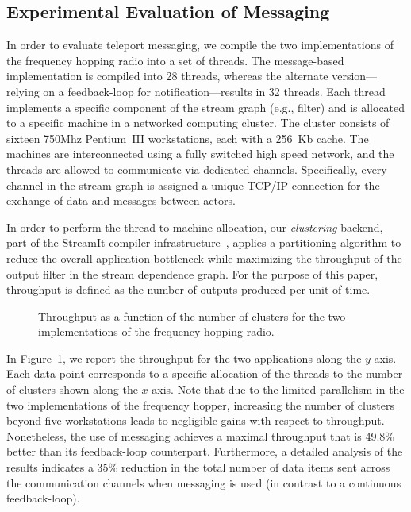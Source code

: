 

\subsection{Experimental Evaluation of Messaging}

In order to evaluate teleport messaging, we compile the two
implementations of the frequency hopping radio into a set of
threads. The message-based implementation is compiled into 28 threads,
whereas the alternate version---relying on a feedback-loop for
notification---results in 32 threads.  Each thread implements a
specific component of the stream graph (e.g., filter) and is allocated
to a specific machine in a networked computing cluster.  The cluster
consists of sixteen 750Mhz Pentium~III workstations, each with a
256~Kb cache.  The machines are interconnected using a fully switched
high speed network, and the threads are allowed to communicate via
dedicated channels. Specifically, every channel in the stream graph is
assigned a unique TCP/IP connection for the exchange of data and
messages between actors.

In order to perform the thread-to-machine allocation, our {\it
clustering} backend, part of the StreamIt compiler
infrastructure~\cite{streamit-asplos}, applies a partitioning
algorithm to reduce the overall application bottleneck while
maximizing the throughput of the output filter in the stream
dependence graph. For the purpose of this paper, throughput is defined
as the number of outputs produced per unit of time.

\begin{figure}[t]
\caption{\small Throughput as a function of the number of clusters for
the two implementations of the frequency hopping radio.
\protect\label{fig:fhr-throughput}}
\end{figure}

In Figure~\ref{fig:fhr-throughput}, we report the throughput for the
two applications along the $y$-axis.  Each data point corresponds to a
specific allocation of the threads to the number of clusters shown
along the $x$-axis.  Note that due to the limited parallelism in the
two implementations of the frequency hopper, increasing the number of
clusters beyond five workstations leads to negligible gains with
respect to throughput.  Nonetheless, the use of messaging achieves a
maximal throughput that is 49.8\% better than its feedback-loop
counterpart. Furthermore, a detailed analysis of the results indicates
a 35\% reduction in the total number of data items sent across the
communication channels when messaging is used (in contrast to a
continuous feedback-loop).

